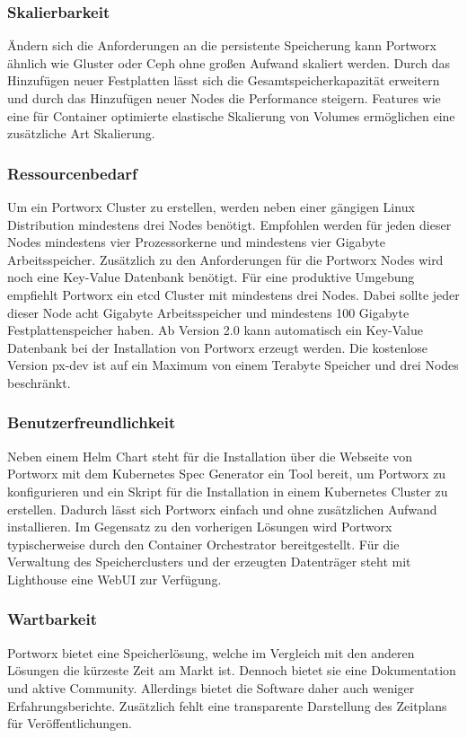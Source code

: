 \subsubsection{Skalierbarkeit}
Ändern sich die Anforderungen an die persistente Speicherung kann Portworx ähnlich wie Gluster oder Ceph ohne großen Aufwand skaliert werden. Durch das Hinzufügen neuer Festplatten lässt sich die Gesamtspeicherkapazität erweitern und durch das Hinzufügen neuer Nodes die Performance steigern. Features wie eine für Container optimierte elastische Skalierung von Volumes ermöglichen eine zusätzliche Art Skalierung.

\subsubsection{Ressourcenbedarf}
Um ein Portworx Cluster zu erstellen, werden neben einer gängigen Linux Distribution mindestens drei Nodes benötigt. Empfohlen werden für jeden dieser Nodes mindestens vier Prozessorkerne und mindestens vier Gigabyte Arbeitsspeicher. Zusätzlich zu den Anforderungen für die Portworx Nodes wird noch eine Key-Value Datenbank benötigt. Für eine produktive Umgebung empfiehlt Portworx ein etcd Cluster mit mindestens drei Nodes. Dabei sollte jeder dieser Node acht Gigabyte Arbeitsspeicher und mindestens 100 Gigabyte Festplattenspeicher haben. Ab Version 2.0 kann automatisch ein Key-Value Datenbank bei der Installation von Portworx erzeugt werden. Die kostenlose Version px-dev ist auf ein Maximum von einem Terabyte Speicher und drei Nodes beschränkt.

\subsubsection{Benutzerfreundlichkeit}
Neben einem Helm Chart steht für die Installation über die Webseite von Portworx mit dem Kubernetes Spec Generator ein Tool bereit, um Portworx zu konfigurieren und ein Skript für die Installation in einem Kubernetes Cluster zu erstellen. Dadurch lässt sich Portworx einfach und ohne zusätzlichen Aufwand installieren.
Im Gegensatz zu den vorherigen Lösungen wird Portworx typischerweise durch den Container Orchestrator bereitgestellt.
Für die Verwaltung des Speicherclusters und der erzeugten Datenträger steht mit Lighthouse eine WebUI zur Verfügung.

\subsubsection{Wartbarkeit}
Portworx bietet eine Speicherlösung, welche im Vergleich mit den anderen Lösungen die kürzeste Zeit am Markt ist. Dennoch bietet sie eine Dokumentation und aktive Community. Allerdings bietet die Software daher auch weniger Erfahrungsberichte. Zusätzlich fehlt eine transparente Darstellung des Zeitplans für Veröffentlichungen.

